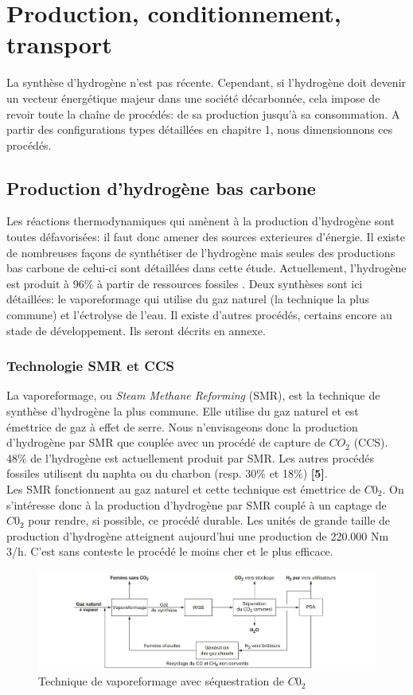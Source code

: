 \documentclass[11pt,french,a4paper]{article}
\begin{document}
\section{Production, conditionnement, transport}
La synthèse d'hydrogène n'est pas récente. Cependant, si l'hydrogène doit devenir un vecteur énergétique majeur dans une société décarbonnée, cela impose de revoir toute la chaîne de procédés: de sa production jusqu'à sa consommation. A partir des configurations types détaillées en chapitre 1, nous dimensionnons ces procédés.
\subsection{Production d'hydrogène bas carbone}
Les réactions thermodynamiques qui amènent à la production d'hydrogène sont toutes défavorisées: il faut donc amener des sources exterieures d'énergie. Il existe de nombreuses façons de synthétiser de l'hydrogène mais seules des productions bas carbone de celui-ci sont détaillées dans cette étude.  Actuellement, l'hydrogène est  produit à 96\% à partir de ressources fossiles \cite{Surla2019}. Deux synthèses sont ici détaillées: le vaporeformage qui utilise du gaz naturel (la technique la plus commune) et l'éctrolyse de l'eau. Il existe d'autres procédés, certains encore au stade de développement. Ils seront décrits en annexe.

\subsubsection{Technologie SMR et CCS}
La vaporeformage, ou \emph{Steam Methane Reforming} (SMR), est la technique de synthèse d'hydrogène la plus commune. Elle utilise du gaz naturel et est émettrice de gaz à effet de serre. Nous n'envisageons donc la production d'hydrogène par SMR que couplée  avec un procédé de capture de $CO_2$ (CCS).$48 \% $ de l'hydrogène est actuellement produit par SMR. Les autres procédés fossiles utilisent du naphta ou du charbon (resp. 30\% et 18\%) \textbf{[5]}. \\  Les SMR fonctionnent au gaz naturel et cette technique est émettrice de $C0_2$. On s'intéresse donc à la production d'hydrogène par SMR couplé à un captage de $C0_2$ pour rendre, si possible, ce procédé durable. Les unités de grande taille de production d'hydrogène atteignent aujourd’hui une production de 220.000 Nm 3/h. C'est sans conteste le procédé le moins cher et le plus efficace.

\begin{center}
\begin{figure}[!h]
\includegraphics[width=0.95\linewidth]{image/chap3/Vapo_avec_sequestration.jpg}
\caption{Technique de vaporeformage avec séquestration de $C0_2$ \cite{Prod_gaz_synth}}
\end{figure}
\end{center}
\end{document}
